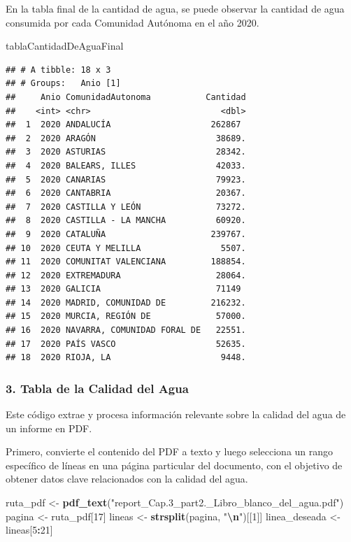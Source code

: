 \documentclass[
]{article}
\newenvironment{Shaded}{\begin{snugshade}}{\end{snugshade}}
\newcommand{\DecValTok}[1]{\textcolor[rgb]{0.00,0.00,0.81}{#1}}
\newcommand{\FunctionTok}[1]{\textcolor[rgb]{0.13,0.29,0.53}{\textbf{#1}}}
\newcommand{\NormalTok}[1]{#1}
\newcommand{\OtherTok}[1]{\textcolor[rgb]{0.56,0.35,0.01}{#1}}
\newcommand{\SpecialCharTok}[1]{\textcolor[rgb]{0.81,0.36,0.00}{\textbf{#1}}}
\newcommand{\StringTok}[1]{\textcolor[rgb]{0.31,0.60,0.02}{#1}}
\begin{document}
En la tabla final de la cantidad de agua, se puede observar la cantidad
de agua consumida por cada Comunidad Autónoma en el año 2020.

\begin{Shaded}
\begin{Highlighting}[]
\NormalTok{tablaCantidadDeAguaFinal}
\end{Highlighting}
\end{Shaded}

\begin{verbatim}
## # A tibble: 18 x 3
## # Groups:   Anio [1]
##     Anio ComunidadAutonoma           Cantidad
##    <int> <chr>                          <dbl>
##  1  2020 ANDALUCÍA                    262867 
##  2  2020 ARAGÓN                        38689.
##  3  2020 ASTURIAS                      28342.
##  4  2020 BALEARS, ILLES                42033.
##  5  2020 CANARIAS                      79923.
##  6  2020 CANTABRIA                     20367.
##  7  2020 CASTILLA Y LEÓN               73272.
##  8  2020 CASTILLA - LA MANCHA          60920.
##  9  2020 CATALUÑA                     239767.
## 10  2020 CEUTA Y MELILLA                5507.
## 11  2020 COMUNITAT VALENCIANA         188854.
## 12  2020 EXTREMADURA                   28064.
## 13  2020 GALICIA                       71149 
## 14  2020 MADRID, COMUNIDAD DE         216232.
## 15  2020 MURCIA, REGIÓN DE             57000.
## 16  2020 NAVARRA, COMUNIDAD FORAL DE   22551.
## 17  2020 PAÍS VASCO                    52635.
## 18  2020 RIOJA, LA                      9448.
\end{verbatim}

\hypertarget{tabla-de-la-calidad-del-agua}{%
\subsubsection{3. Tabla de la Calidad del
Agua}\label{tabla-de-la-calidad-del-agua}}

Este código extrae y procesa información relevante sobre la calidad del
agua de un informe en PDF.

Primero, convierte el contenido del PDF a texto y luego selecciona un
rango específico de líneas en una página particular del documento, con
el objetivo de obtener datos clave relacionados con la calidad del agua.

\begin{Shaded}
\begin{Highlighting}[]
\NormalTok{ruta\_pdf }\OtherTok{\textless{}{-}} \FunctionTok{pdf\_text}\NormalTok{(}\StringTok{"report\_Cap.3\_part2.\_Libro\_blanco\_del\_agua.pdf"}\NormalTok{)}
\NormalTok{pagina }\OtherTok{\textless{}{-}}\NormalTok{ ruta\_pdf[}\DecValTok{17}\NormalTok{]}
\NormalTok{lineas }\OtherTok{\textless{}{-}} \FunctionTok{strsplit}\NormalTok{(pagina, }\StringTok{"}\SpecialCharTok{\textbackslash{}n}\StringTok{"}\NormalTok{)[[}\DecValTok{1}\NormalTok{]]}
\NormalTok{linea\_deseada }\OtherTok{\textless{}{-}}\NormalTok{ lineas[}\DecValTok{5}\SpecialCharTok{:}\DecValTok{21}\NormalTok{] }
\end{Highlighting}
\end{Shaded}
\end{document}
